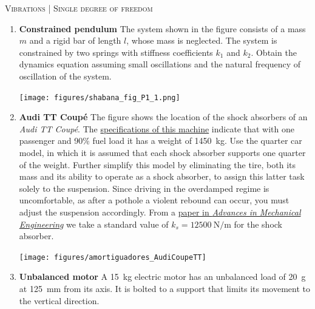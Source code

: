 \documentclass[11pt, english, a4paper, twopage]{article}
\begin{document}
\begin{center}
 \textsc{\large Vibrations | Single degree of freedom}
\end{center}
\begin{enumerate}
\item
\begin{minipage}[t][4cm]{0.65\textwidth}
 \textbf{Constrained pendulum}
 The system shown in the figure consists of a mass $m$ and a rigid bar of length $l$, whose mass is neglected.
 The system is constrained by two springs with stiffness coefficients $k_1$ and $k_2$.
 Obtain the dynamics equation assuming small oscillations and the natural frequency of oscillation of the system.
\end{minipage}
\begin{minipage}[c][3cm][t]{0.3\textwidth}
 \texttt{[image: figures/shabana\_fig\_P1\_1.png]}
\end{minipage}
\item
\begin{minipage}[t][6cm]{0.65\textwidth}
 \textbf{Audi TT Coupé}
 The figure shows the location of the shock absorbers of an \emph{Audi TT Coupé}.
 The \href{https://media.audiusa.com/assets/documents/original/8253-FINAL2021TTTechSpecs.pdf}{specifications of this machine} indicate that with one passenger and 90\% fuel load it has a weight of \SI{1450}{\kilo\gram}.
 Use the quarter car model, in which it is assumed that each shock absorber supports one quarter of the weight.
 Further simplify this model by eliminating the tire, both its mass and its ability to operate as a shock absorber, to assign this latter task solely to the suspension.
 Since driving in the overdamped regime is uncomfortable, as after a pothole a violent rebound can occur, you must adjust the suspension accordingly.
 From a \href{https://journals.sagepub.com/doi/pdf/10.1177/1687814016648638}{paper in \emph{Advances in Mechanical Engineering}} we take a standard value of $k_s = \SI{12500}{\newton\per\metre}$ for the shock absorber.
\end{minipage}
\begin{minipage}[c][0cm][t]{0.3\textwidth}
 \texttt{[image: figures/amortiguadores\_AudiCoupeTT]}
\end{minipage}
\item
 \begin{minipage}[t][3.5cm]{0.75\textwidth}
 \textbf{Unbalanced motor}
 A \SI{15}{\kilo\gram} electric motor has an unbalanced load of \SI{20}{\gram} at \SI{125}{\milli\metre} from its axis.
 It is bolted to a support that limits its movement to the vertical direction.

\end{minipage}
\end{enumerate}
\end{document}
